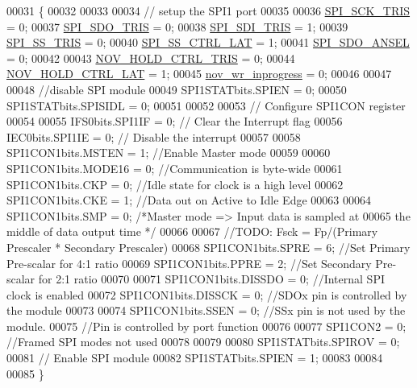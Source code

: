 \begin{DoxyCode}
00031 \{
00032 
00033 
00034     \textcolor{comment}{// setup the SPI1 port}
00035     
00036             \hyperlink{a00011_a98c4bd0ee0f76eb205e874355bf9cd33}{SPI\_SCK\_TRIS}        = 0;
00037             \hyperlink{a00011_aa171067a2f57d1555ab4449c78847c72}{SPI\_SDO\_TRIS}        = 0;
00038             \hyperlink{a00011_a40c85fd42ffb12b326b7cb9ee48f2ffb}{SPI\_SDI\_TRIS}        = 1;
00039             \hyperlink{a00011_a1424f86a2482cfbcf68f709ce542e262}{SPI\_SS\_TRIS}         = 0;
00040             \hyperlink{a00011_aa8b53e04161d178ebd9c01edf1584039}{SPI\_SS\_CTRL\_LAT}     = 1;
00041             \hyperlink{a00011_a11571727bdbc21b0bfb7c701599e759b}{SPI\_SDO\_ANSEL}       = 0;
00042             
00043            \hyperlink{a00027_a37dc9980ee3379d4bd3a66f7cf9d761e}{NOV\_HOLD\_CTRL\_TRIS}   = 0;
00044            \hyperlink{a00027_aa03a6ff293decd7159ed1642ccbac971}{NOV\_HOLD\_CTRL\_LAT}    = 1;
00045            \hyperlink{a00027_a56fe014653ebdce270aeac664bf86e65}{nov\_wr\_inprogress}    = 0;
00046 
00047 
00048       \textcolor{comment}{//disable SPI module}
00049        SPI1STATbits.SPIEN       = 0;
00050        SPI1STATbits.SPISIDL     = 0;
00051     
00052 
00053 \textcolor{comment}{// Configure SPI1CON register}
00054     
00055         IFS0bits.SPI1IF         = 0;    \textcolor{comment}{// Clear the Interrupt flag}
00056         IEC0bits.SPI1IE         = 0;    \textcolor{comment}{// Disable the interrupt}
00057 
00058         SPI1CON1bits.MSTEN      = 1;   \textcolor{comment}{//Enable Master mode}
00059 
00060         SPI1CON1bits.MODE16     = 0;  \textcolor{comment}{//Communication is byte-wide}
00061         SPI1CON1bits.CKP        = 0;   \textcolor{comment}{//Idle state for clock is a high level}
00062         SPI1CON1bits.CKE        = 1;   \textcolor{comment}{//Data out on Active to Idle Edge}
00063 
00064         SPI1CON1bits.SMP        = 0;  \textcolor{comment}{/*Master mode => Input data is sampled at}
00065 \textcolor{comment}{                                        the middle of data output time */}
00066 
00067         \textcolor{comment}{//TODO: Fsck = Fp/(Primary Prescaler * Secondary Prescaler)}
00068         SPI1CON1bits.SPRE       = 6;     \textcolor{comment}{//Set Primary Pre-scalar for 4:1 ratio}
00069         SPI1CON1bits.PPRE       = 2;     \textcolor{comment}{//Set Secondary Pre-scalar for 2:1 ratio}
00070 
00071         SPI1CON1bits.DISSDO     = 0;     \textcolor{comment}{//Internal SPI clock is enabled}
00072         SPI1CON1bits.DISSCK     = 0;     \textcolor{comment}{//SDOx pin is controlled by the module}
00073 
00074         SPI1CON1bits.SSEN       = 0;     \textcolor{comment}{//SSx pin is not used by the module.}
00075                                          \textcolor{comment}{//Pin is controlled by port function}
00076 
00077         SPI1CON2                = 0;     \textcolor{comment}{//Framed SPI modes not used}
00078 
00079 
00080         SPI1STATbits.SPIROV     = 0;
00081         \textcolor{comment}{//  Enable SPI module}
00082         SPI1STATbits.SPIEN       = 1;
00083 
00084 
00085 \}
\end{DoxyCode}


